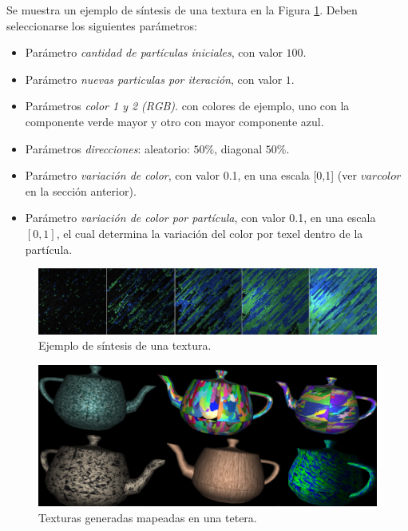 Se muestra un ejemplo de s\'intesis de una textura en la Figura \ref{sintesis}. Deben seleccionarse los siguientes par\'ametros:

\begin{itemize}
\item Par\'ametro {\em cantidad de part\'iculas iniciales}, con valor $100$.
\item Par\'ametro {\em nuevas particulas por iteraci\'on}, con valor $1$.
\item Par\'ametros {\em color 1 y 2 (RGB)}. con colores de ejemplo, uno con la componente verde mayor y otro con mayor componente azul.
\item Par\'ametros {\em direcciones}: aleatorio: $50\%$, diagonal $50\%$.
\item Par\'ametro {\em variaci\'on de color}, con valor 0.1, en una escala [0,1] (ver $varcolor$ en la secci\'on anterior).
\item Par\'ametro {\em variaci\'on de color por part\'icula}, con valor 0.1, en una escala $[0,1]$, el cual determina la variaci\'on del color por texel dentro de la part\'icula.
\end{itemize}

\begin{figure}[t!]
\centering
\includegraphics[scale=0.12]{sintesis}
\caption{Ejemplo de s\'intesis de una textura.}
\label{sintesis}
\end{figure}

\begin{figure}[t!]
\centering
\includegraphics[scale=0.14]{teteras}
\caption{Texturas generadas mapeadas en una tetera.}
\label{teteras}
\end{figure}


